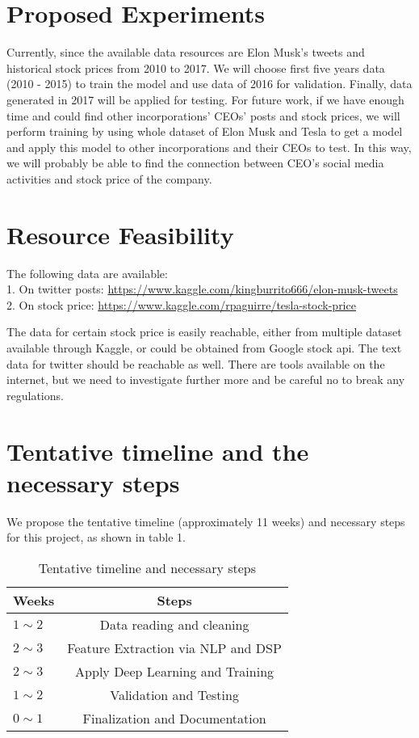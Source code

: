 \documentclass[10pt,twocolumn,letterpaper]{article}
\begin{document}
\section{Proposed Experiments}
Currently, since the available data resources are Elon Musk’s tweets and historical stock prices from 2010 to 2017. We will choose first five years data (2010 - 2015) to train the model and use data of 2016 for validation. Finally, data generated in 2017 will be applied for testing.
For future work, if we have enough time and could find other incorporations’ CEOs’ posts and stock prices, we will perform training by using whole dataset of Elon Musk and Tesla to get a model and apply this model to other incorporations and their CEOs to test. In this way, we will probably be able to find the connection between CEO’s social media activities and stock price of the company.

\section{Resource Feasibility}

The following data are available:\\
1. On twitter posts: \url{https://www.kaggle.com/kingburrito666/elon-musk-tweets}\\
2. On stock price: \url{https://www.kaggle.com/rpaguirre/tesla-stock-price}

The data for certain stock price is easily reachable, either from multiple dataset available through Kaggle, or could be obtained from Google stock api.
The text data for twitter should be reachable as well. There are tools available on the internet, but we need to investigate further more and be careful no to break any regulations.

\section{Tentative timeline and the necessary steps}
We propose the tentative timeline (approximately 11 weeks) and necessary steps for this project, as shown in table 1.

\begin{table}
\begin{center}
\begin{tabular}{|l|c|}
\hline
Weeks & Steps \\
\hline\hline
$1\sim2$ & Data reading and cleaning \\
$2\sim3$ & Feature Extraction via NLP and DSP\\
$2\sim3$ & Apply Deep Learning and Training\\
$1\sim2$ & Validation and Testing\\
$0\sim1$ & Finalization and Documentation \\
\hline
\end{tabular}
\end{center}
\caption{Tentative timeline and necessary steps}
\end{table}

{\small


}
\end{document}
